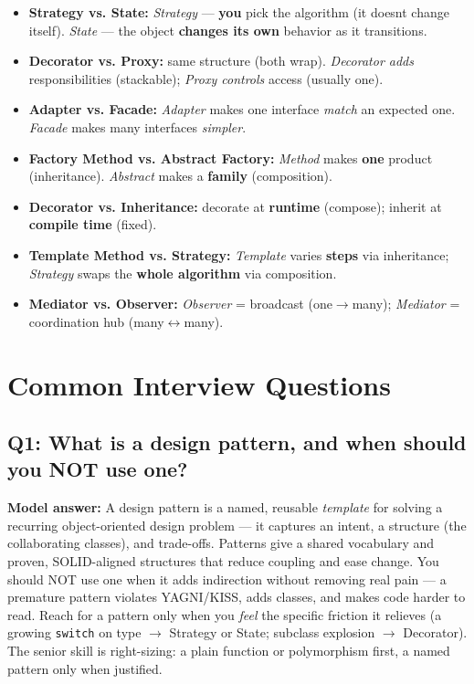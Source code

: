 \documentclass[11pt]{article}
\providecommand{\tightlist}{\setlength{\itemsep}{1pt}\setlength{\parskip}{0pt}}
\begin{document}
\begin{itemize}
\tightlist
\item
  \textbf{Strategy vs. State:} \emph{Strategy} --- \textbf{you} pick the algorithm (it doesn\textquotesingle t change itself). \emph{State} --- the object \textbf{changes its own} behavior as it transitions.
\item
  \textbf{Decorator vs. Proxy:} same structure (both wrap). \emph{Decorator adds} responsibilities (stackable); \emph{Proxy controls} access (usually one).
\item
  \textbf{Adapter vs. Facade:} \emph{Adapter} makes one interface \emph{match} an expected one. \emph{Facade} makes many interfaces \emph{simpler}.
\item
  \textbf{Factory Method vs. Abstract Factory:} \emph{Method} makes \textbf{one} product (inheritance). \emph{Abstract} makes a \textbf{family} (composition).
\item
  \textbf{Decorator vs. Inheritance:} decorate at \textbf{runtime} (compose); inherit at \textbf{compile time} (fixed).
\item
  \textbf{Template Method vs. Strategy:} \emph{Template} varies \textbf{steps} via inheritance; \emph{Strategy} swaps the \textbf{whole algorithm} via composition.
\item
  \textbf{Mediator vs. Observer:} \emph{Observer} = broadcast (one\(\rightarrow\)many); \emph{Mediator} = coordination hub (many\(\leftrightarrow\)many).
\end{itemize}

\section{Common Interview Questions}\label{common-interview-questions}

\subsection{Q1: What is a design pattern, and when should you NOT use one?}\label{q1-what-is-a-design-pattern-and-when-should-you-not-use-one}

\textbf{Model answer:} A design pattern is a named, reusable \emph{template} for solving a recurring object-oriented design problem --- it captures an intent, a structure (the collaborating classes), and trade-offs. Patterns give a shared vocabulary and proven, SOLID-aligned structures that reduce coupling and ease change. You should NOT use one when it adds indirection without removing real pain --- a premature pattern violates YAGNI/KISS, adds classes, and makes code harder to read. Reach for a pattern only when you \emph{feel} the specific friction it relieves (a growing \texttt{switch} on type \(\rightarrow\) Strategy or State; subclass explosion \(\rightarrow\) Decorator). The senior skill is right-sizing: a plain function or polymorphism first, a named pattern only when justified.
\end{document}
